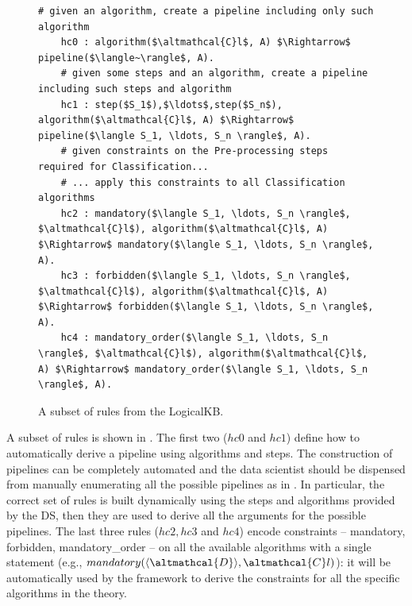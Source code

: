 \begin{figure}[t]
    \begin{lstlisting}[mathescape=true]
    # given an algorithm, create a pipeline including only such algorithm
    hc0 : algorithm($\altmathcal{C}l$, A) $\Rightarrow$ pipeline($\langle~\rangle$, A).
    # given some steps and an algorithm, create a pipeline including such steps and algorithm
    hc1 : step($S_1$),$\ldots$,step($S_n$), algorithm($\altmathcal{C}l$, A) $\Rightarrow$ pipeline($\langle S_1, \ldots, S_n \rangle$, A).
    # given constraints on the Pre-processing steps required for Classification...
    # ... apply this constraints to all Classification algorithms
    hc2 : mandatory($\langle S_1, \ldots, S_n \rangle$, $\altmathcal{C}l$), algorithm($\altmathcal{C}l$, A) $\Rightarrow$ mandatory($\langle S_1, \ldots, S_n \rangle$, A).
    hc3 : forbidden($\langle S_1, \ldots, S_n \rangle$, $\altmathcal{C}l$), algorithm($\altmathcal{C}l$, A) $\Rightarrow$ forbidden($\langle S_1, \ldots, S_n \rangle$, A).
    hc4 : mandatory_order($\langle S_1, \ldots, S_n \rangle$, $\altmathcal{C}l$), algorithm($\altmathcal{C}l$, A) $\Rightarrow$ mandatory_order($\langle S_1, \ldots, S_n \rangle$, A).
    \end{lstlisting}
    \caption{A subset of rules from the LogicalKB.}
    \label{rules-arg2p}
    \end{figure}

A subset of rules is shown in .
The first two ($hc0$ and $hc1$) define how to automatically derive a pipeline using algorithms and steps.
The construction of pipelines can be completely automated and the data scientist should be dispensed from manually enumerating all the possible pipelines as in .
In particular, the correct set of rules is built dynamically using the steps and algorithms provided by the DS, then they are used to derive all the arguments for the possible pipelines.
The last three rules ($hc2, hc3$ and $hc4$) encode constraints -- mandatory, forbidden, mandatory\_order -- on all the available algorithms with a single statement (e.g., $mandatory(\langle \altmathcal{D} \rangle, \altmathcal{C}l)$): it will be automatically used by the framework to derive the constraints for all the specific algorithms in the theory.

